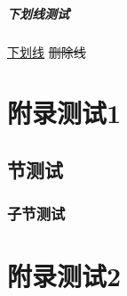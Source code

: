 \documentclass{resources/DocClass}
\begin{document}
    \paragraph{下划线测试}
    \uline{下划线}
    \sout{删除线}

    \nocite{*} %
    \printbibliography %

    \appendix
    \chapter{附录测试1}
    \section{节测试}
    \subsection{子节测试}
    \chapter{附录测试2}
\end{document}
